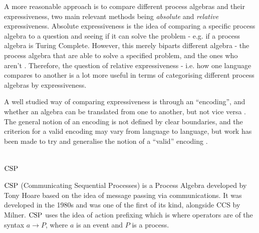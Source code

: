 \documentclass[../hons_project.tex]{subfiles}
\begin{document}
A more reasonable approach is to compare different process algebras and their expressiveness, two main relevant methods being \textit{absolute} and \textit{relative} expressiveness.\citep{parrowExpressivenessProcessAlgebras2008} Absolute expressiveness is the idea of comparing a specific process algebra to a question and seeing if it can solve the problem - e.g. if a process algebra is Turing Complete. However, this merely biparts different algebra - the process algebra that are able to solve a specified problem, and the ones who aren't \citep{gorlaUnifiedApproachEncodability2010}. Therefore, the question of relative expressiveness - i.e. how one language compares to another is a lot more useful in terms of categorising different process algebras by expressiveness.


A well studied way of comparing expressiveness is through an ``encoding'', and whether an algebra can be translated from one to another, but not vice versa \citep{petersComparingProcessCalculi2019}. The general notion of an encoding is not defined by clear boundaries, and the criterion for a valid encoding may vary from language to language, but work has been made to try and generalise the notion of a ``valid'' encoding \citep{gorlaUnifiedApproachEncodability2010, DBLP:conf/fossacs/Glabbeek18}.

\section{\texorpdfstring{$\mathrm{CSP}$}{CSP}}
$\mathrm{CSP}$ (Communicating Sequential Processes) \citep{brookesTheoryCommunicatingSequential1984} is a Process Algebra developed by Tony Hoare based on the idea of message passing via communications. It was developed in the 1980s and was one of the first of its kind, alongside CCS by Milner. $\mathrm{CSP}$ uses the idea of action prefixing which is where operators are of the syntax $a \to P$, where $a$ is an event and $P$ is a process. 

\end{document}
